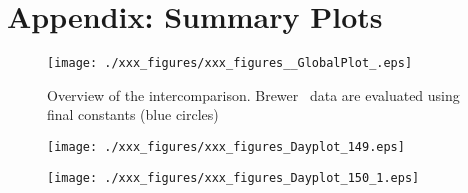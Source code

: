 \section{Appendix: Summary Plots} \label{pag:append}

\vspace{1cm}
\begin{figure}[hbtp!]
\begin{center}   
     \texttt{[image: ./xxx\_figures/xxx\_figures\_\_GlobalPlot\_.eps]}
     \caption{Overview of the intercomparison. Brewer \brwname\ data are evaluated using final constants (blue circles)}
	   \label{fig:GlobalPlot}
\end{center}
\end{figure}

\vspace{1cm}
\begin{figure}[hbtp!]
\begin{center}   
     \texttt{[image: ./xxx\_figures/xxx\_figures\_Dayplot\_149.eps]}
	   \label{fig:GlobalPlot}
\end{center}
\end{figure}

\vspace{1cm}
\begin{figure}[hbtp!]
\begin{center}   
     \texttt{[image: ./xxx\_figures/xxx\_figures\_Dayplot\_150\_1.eps]}
	   \label{fig:GlobalPlot}
\end{center}
\end{figure}

